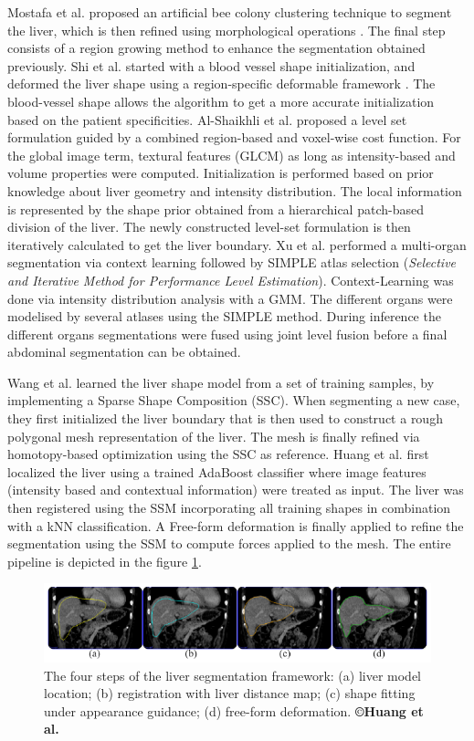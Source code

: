 Mostafa et al.\cite{Mostafa2015} proposed an artificial bee colony clustering technique to
segment the liver, which is then refined using morphological operations .
The final step consists of a region growing method to enhance the
segmentation obtained previously.
Shi et al. started with a blood vessel shape initialization, and deformed
the liver shape using a region-specific deformable framework \cite{Shi2016}. The
blood-vessel shape allows the algorithm to get a more accurate
initialization based on the patient specificities. Al-Shaikhli et al. \cite{Al-Shaikhli2015} proposed a level set formulation guided by a combined region-based and
voxel-wise cost function. For the global image term, textural features
(GLCM) as long as intensity-based and volume properties were computed.
Initialization is performed based on prior knowledge about liver
geometry and intensity distribution. The local information is
represented by the shape prior obtained from a hierarchical patch-based
division of the liver. The newly constructed level-set formulation is
then iteratively calculated to get the liver boundary.
Xu et al. \cite{Xu2015} performed a multi-organ segmentation via context learning
followed by SIMPLE atlas selection (\emph{Selective and Iterative Method
	for Performance Level Estimation}). Context-Learning was done via
intensity distribution analysis with a GMM. The different organs were modelised by several atlases using
the SIMPLE method. During inference the different organs segmentations
were fused using joint level fusion before a final abdominal
segmentation can be obtained.

Wang et al. \cite{Wang2015b} learned the liver shape model from a set of training
samples, by implementing a Sparse Shape Composition (SSC). When
segmenting a new case, they first initialized the liver boundary that is
then used to construct a rough polygonal mesh representation of the
liver. The mesh is finally refined via homotopy-based optimization using
the SSC as reference.
Huang et al. \cite{Huang2014} first localized the liver using a trained AdaBoost
classifier where image features (intensity based and contextual
information) were treated as input. The liver was then registered using
the SSM incorporating all training shapes in combination with a kNN
classification. A Free-form deformation is finally applied to refine the
segmentation using the SSM to compute forces applied to the mesh. The
entire pipeline is depicted in the figure \ref{Huang2014_Fig1}.


\begin{figure}[th!]
	\centering
	\includegraphics[width=0.7\linewidth]{images/Huang2014_Fig4_v2}
	\caption{The four steps of the liver segmentation framework: (a) liver model location; (b) registration with liver distance map; (c) shape fitting under appearance guidance; (d) free-form deformation. \textbf{©Huang et al. \cite{Huang2014}}}
	\label{Huang2014_Fig1}
\end{figure}


